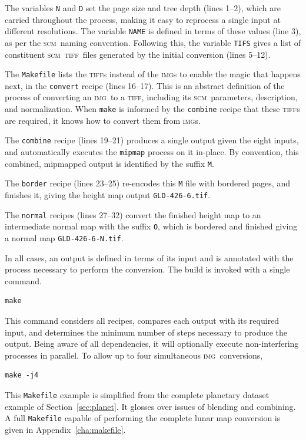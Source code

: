 \documentclass[oneside,10pt]{memoir}
\newcommand{\scm}     {\textsc{scm}}
\newcommand{\tiff}    {\textsc{tiff}}
\newcommand{\img}     {\textsc{img}}
\begin{document}
\begin{Spacing}{1.1}
The variables \texttt{N} and \texttt{D} set the page size and tree depth (lines 1--2), which are carried throughout the process, making it easy to reprocess a single input at different resolutions. The variable \texttt{NAME} is defined in terms of these values (line 3), as per the \scm\ naming convention. Following this, the variable \texttt{TIFS} gives a list of constituent \scm\ \tiff\ files generated by the initial conversion (lines 5--12).

The \texttt{Makefile} lists the \tiff s instead of the \img s to enable the magic that happens next, in the \texttt{convert} recipe (lines 16--17). This is an abstract definition of the process of converting an \img\ to a \tiff, including its \scm\ parameters, description, and normalization. When \texttt{make} is informed by the \texttt{combine} recipe that these \tiff s are required, it knows how to convert them from \img s.

The \texttt{combine} recipe (lines 19--21) produces a single output given the eight inputs, and automatically executes the \texttt{mipmap} process on it in-place. By convention, this combined, mipmapped output is identified by the suffix \texttt{M}.

The \texttt{border} recipe (lines 23--25) re-encodes this \texttt{M} file with bordered pages, and finishes it, giving the height map output \texttt{GLD-426-6.tif}.

The \texttt{normal} recipes (lines 27--32) convert the finished height map to an intermediate normal map with the suffix \texttt{O}, which is bordered and finished giving a normal map \texttt{GLD-426-6-N.tif}.

In all cases, an output is defined in terms of its input and is annotated with the process necessary to perform the conversion. The build is invoked with a single command.

\begin{Verbatim}
make
\end{Verbatim}

This command considers all recipes, compares each output with its required input, and determines the minimum number of steps necessary to produce the output. Being aware of all dependencies, it will optionally execute non-interfering processes in parallel. To allow up to four simultaneous \img\ conversions,

\begin{Verbatim}
make -j4
\end{Verbatim}

This \texttt{Makefile} example is simplified from the complete planetary dataset example of Section~\ref{sec:planet}. It glosses over issues of blending and combining. A full \texttt{Makefile} capable of performing the complete lunar map conversion is given in Appendix~\ref{cha:makefile}.


\end{Spacing}
\end{document}
